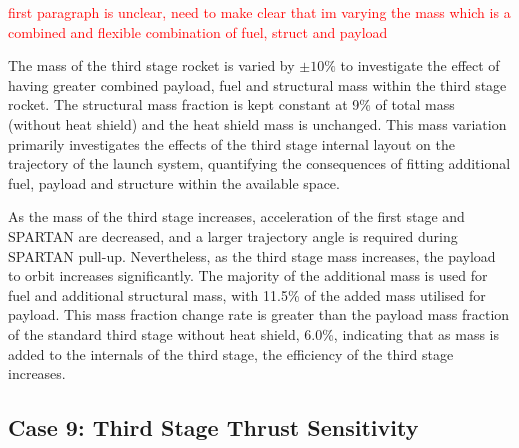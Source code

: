 \textcolor{red}{first paragraph is unclear, need to make clear that im varying the mass which is a combined and flexible combination of fuel, struct and payload}

The mass of the third stage rocket is varied by $\pm10\%$ to investigate the effect of having greater combined  payload, fuel and structural mass within the third stage rocket. The structural mass fraction is kept constant at 9\% of total mass (without heat shield) and the heat shield mass is unchanged. This mass variation primarily investigates the effects of the third stage internal layout on the trajectory of the launch system, quantifying the consequences of fitting additional fuel, payload and structure within the available space.
  
 As the mass of the third stage increases, acceleration of the first stage and SPARTAN are decreased, and a larger trajectory angle is required during SPARTAN pull-up. Nevertheless, as the third stage mass increases, the payload to orbit increases significantly.
The majority of the additional mass is used for fuel and additional structural mass, with 11.5\% of the added mass utilised for payload. This mass fraction change rate is greater than the payload mass fraction of the standard third stage without heat shield, 6.0\%, indicating that as mass is added to the internals of the third stage, the efficiency of the third stage increases.


\subsection{Case 9: Third Stage Thrust Sensitivity}

